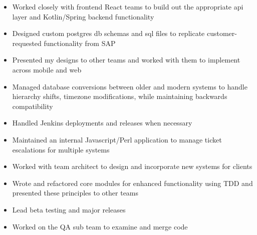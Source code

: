\documentclass[10pt,a4paper,ragged2e]{altacv}
\begin{document}
\divider

\begin{itemize}
\item Worked closely with frontend React teams to build out the appropriate api layer and Kotlin/Spring backend functionality
\item Designed custom postgres db schemas and sql files to replicate customer-requested functionality from SAP
\item Presented my designs to other teams and worked with them to implement across mobile
and web
\item Managed database conversions between older and modern systems to handle hierarchy shifts,
timezone modifications, while maintaining backwards compatibility 
\item Handled Jenkins deployments and releases when necessary
\end{itemize}

\divider

\begin{itemize}
\item Maintained an internal Javascript/Perl application to manage ticket escalations for multiple systems
\item Worked with team architect to design and incorporate new systems for clients
\item Wrote and refactored core modules for enhanced functionality using TDD and presented these principles to other teams
\item Lead beta testing and major releases
\item Worked on the QA sub team to examine and merge code
\end{itemize}

\divider
\end{document}
